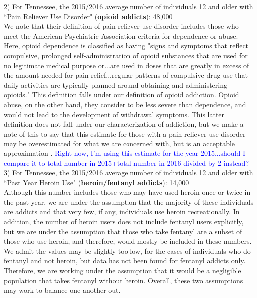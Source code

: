 \documentclass[12pt]{article}
\begin{document}
2) For Tennessee, the 2015/2016 average number of individuals 12 and older with ``Pain Reliever Use Disorder" (\textbf{opioid addicts}): 48,000 \cite{NSDUH2} \\
We note that their definition of pain reliever use disorder includes those who meet the American Psychiatric Association criteria for dependence or abuse. Here, opioid dependence is classified as having "signs and symptoms that reflect compulsive, prolonged self-administration of opioid substances that are used for no legitimate medical purpose or...are used in doses that are greatly in excess of the amount needed for pain relief...regular patterns of compulsive drug use that daily activities are typically planned around obtaining and administering opioids." This definition falls under our definition of opioid addiction. Opioid abuse, on the other hand, they consider to be less severe than dependence, and would not lead to the development of withdrawal symptoms. This latter definition does not fall under our characterization of addiction, but we make a note of this to say that this estimate for those with a pain reliever use disorder may be overestimated for what we are concerned with, but is an acceptable approximation \cite{DSM}. \textcolor{blue}{Right now, I'm using this estimate for the year 2015...should I compare it to total number in 2015+total number in 2016 divided by 2 instead?} \\

3) For Tennessee, the 2015/2016 average number of individuals 12 and older with ``Past Year Heroin Use" (\textbf{heroin/fentanyl addicts}): 14,000 \cite{NSDUH2}  \\ 
Although this number includes those who may have used heroin once or twice in the past year, we are under the assumption that the majority of these individuals are addicts and that very few, if any, individuals use heroin recreationally. In addition, the number of heroin users does not include fentanyl users explicitly, but we are under the assumption that those who take fentanyl are a subset of those who use heroin, and therefore, would mostly be included in these numbers. We admit the values may be slightly too low, for the cases of individuals who do fentanyl and not heroin, but data has not been found for fentanyl addicts only. Therefore, we are working under the assumption that it would be a negligible population that takes fentanyl without heroin. Overall, these two assumptions may work to balance one another out. 
\\
\end{document}
